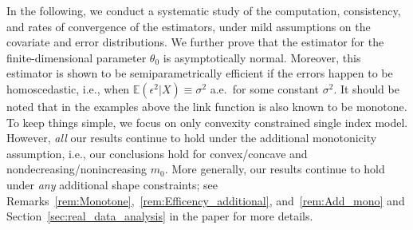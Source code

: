 In the following, we conduct a systematic study of the computation, consistency, and rates of convergence of the estimators, under mild assumptions on the covariate and error distributions. We further prove that the estimator for the finite-dimensional parameter $\theta_0$ is asymptotically normal. Moreover, this estimator is shown to be semiparametrically efficient if the errors happen to be homoscedastic, i.e., when $\mathbb{E}(\epsilon^2|X) \equiv \sigma^2$ a.e.~for some constant $\sigma^2$. It should be noted that in the examples above the link function is also known to be monotone. To keep things simple, we focus on  only convexity constrained single index model. However, \textit{all} our results continue to hold under the additional monotonicity assumption, i.e., our conclusions hold for convex/concave and nondecreasing/nonincreasing $m_0$. {More generally, our results continue to hold under \textit{any} additional shape constraints; see Remarks~\ref{rem:Monotone},~\ref{rem:Efficency_additional}, and~\ref{rem:Add_mono} and Section~\ref{sec:real_data_analysis} in the paper for more details.}





